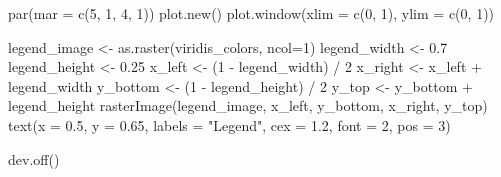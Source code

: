 \documentclass[
  letterpaper,
  DIV=11,
  numbers=noendperiod]{scrreprt}
\newenvironment{Shaded}{\begin{snugshade}}{\end{snugshade}}
\newcommand{\AttributeTok}[1]{\textcolor[rgb]{0.40,0.45,0.13}{#1}}
\newcommand{\DecValTok}[1]{\textcolor[rgb]{0.68,0.00,0.00}{#1}}
\newcommand{\FloatTok}[1]{\textcolor[rgb]{0.68,0.00,0.00}{#1}}
\newcommand{\FunctionTok}[1]{\textcolor[rgb]{0.28,0.35,0.67}{#1}}
\newcommand{\NormalTok}[1]{\textcolor[rgb]{0.00,0.23,0.31}{#1}}
\newcommand{\OtherTok}[1]{\textcolor[rgb]{0.00,0.23,0.31}{#1}}
\newcommand{\SpecialCharTok}[1]{\textcolor[rgb]{0.37,0.37,0.37}{#1}}
\newcommand{\StringTok}[1]{\textcolor[rgb]{0.13,0.47,0.30}{#1}}
\begin{document}
\begin{Shaded}
\begin{Highlighting}[]
\FunctionTok{par}\NormalTok{(}\AttributeTok{mar =} \FunctionTok{c}\NormalTok{(}\DecValTok{5}\NormalTok{, }\DecValTok{1}\NormalTok{, }\DecValTok{4}\NormalTok{, }\DecValTok{1}\NormalTok{)) }
\FunctionTok{plot.new}\NormalTok{() }
\FunctionTok{plot.window}\NormalTok{(}\AttributeTok{xlim =} \FunctionTok{c}\NormalTok{(}\DecValTok{0}\NormalTok{, }\DecValTok{1}\NormalTok{), }\AttributeTok{ylim =} \FunctionTok{c}\NormalTok{(}\DecValTok{0}\NormalTok{, }\DecValTok{1}\NormalTok{))}

\NormalTok{legend\_image }\OtherTok{\textless{}{-}} \FunctionTok{as.raster}\NormalTok{(viridis\_colors, }\AttributeTok{ncol=}\DecValTok{1}\NormalTok{)}
\NormalTok{legend\_width }\OtherTok{\textless{}{-}} \FloatTok{0.7}
\NormalTok{legend\_height }\OtherTok{\textless{}{-}} \FloatTok{0.25}
\NormalTok{x\_left }\OtherTok{\textless{}{-}}\NormalTok{ (}\DecValTok{1} \SpecialCharTok{{-}}\NormalTok{ legend\_width) }\SpecialCharTok{/} \DecValTok{2}
\NormalTok{x\_right }\OtherTok{\textless{}{-}}\NormalTok{ x\_left }\SpecialCharTok{+}\NormalTok{ legend\_width}
\NormalTok{y\_bottom }\OtherTok{\textless{}{-}}\NormalTok{ (}\DecValTok{1} \SpecialCharTok{{-}}\NormalTok{ legend\_height) }\SpecialCharTok{/} \DecValTok{2}
\NormalTok{y\_top }\OtherTok{\textless{}{-}}\NormalTok{ y\_bottom }\SpecialCharTok{+}\NormalTok{ legend\_height}
\FunctionTok{rasterImage}\NormalTok{(legend\_image, x\_left, y\_bottom, x\_right, y\_top)}
\FunctionTok{text}\NormalTok{(}\AttributeTok{x =} \FloatTok{0.5}\NormalTok{, }\AttributeTok{y =} \FloatTok{0.65}\NormalTok{, }\AttributeTok{labels =} \StringTok{"Legend"}\NormalTok{, }\AttributeTok{cex =} \FloatTok{1.2}\NormalTok{, }\AttributeTok{font =} \DecValTok{2}\NormalTok{, }\AttributeTok{pos =} \DecValTok{3}\NormalTok{)}

\FunctionTok{dev.off}\NormalTok{()}
\end{Highlighting}
\end{Shaded}
\end{document}
